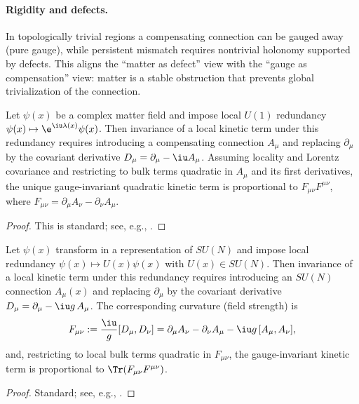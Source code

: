 \paragraph{Rigidity and defects.}
In topologically trivial regions a compensating connection can be gauged away (pure gauge), while persistent mismatch requires nontrivial holonomy supported by defects.
This aligns the ``matter as defect'' view with the ``gauge as compensation'' view: matter is a stable obstruction that prevents global trivialization of the connection.

\begin{proposition}\label{prop:local_rephasing_connection}
Let $\psi(x)$ be a complex matter field and impose local $U(1)$ redundancy $\psi(x)\mapsto \e^{\iu\lambda(x)}\psi(x)$.
Then invariance of a local kinetic term under this redundancy requires introducing a compensating connection $A_\mu$ and replacing $\partial_\mu$ by the covariant derivative $D_\mu=\partial_\mu-\iu A_\mu$.
Assuming locality and Lorentz covariance and restricting to bulk terms quadratic in $A_\mu$ and its first derivatives, the unique gauge-invariant quadratic kinetic term is proportional to $F_{\mu\nu}F^{\mu\nu}$, where $F_{\mu\nu}=\partial_\mu A_\nu-\partial_\nu A_\mu$.
\end{proposition}
\begin{proof}
This is standard; see, e.g., \cite{Weyl1929,PeskinSchroeder1995,WeinbergQFT1995}.
\end{proof}

\begin{proposition}\label{prop:local_sun_connection}
Let $\psi(x)$ transform in a representation of $SU(N)$ and impose local redundancy $\psi(x)\mapsto U(x)\psi(x)$ with $U(x)\in SU(N)$.
Then invariance of a local kinetic term under this redundancy requires introducing an $SU(N)$ connection $A_\mu(x)$ and replacing $\partial_\mu$ by the covariant derivative $D_\mu=\partial_\mu-\iu g\,A_\mu$.
The corresponding curvature (field strength) is
\[
F_{\mu\nu}:=\frac{\iu}{g}[D_\mu,D_\nu]=\partial_\mu A_\nu-\partial_\nu A_\mu-\iu g\,[A_\mu,A_\nu],
\]
and, restricting to local bulk terms quadratic in $F_{\mu\nu}$, the gauge-invariant kinetic term is proportional to $\Tr(F_{\mu\nu}F^{\mu\nu})$.
\end{proposition}
\begin{proof}
Standard; see, e.g., \cite{YangMills1954,PeskinSchroeder1995,WeinbergQFT1995}.
\end{proof}

